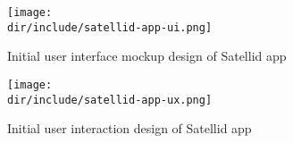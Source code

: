 \begin{figure}[htb]
  \centering
  \texttt{[image: \\dir/include/satellid-app-ui.png]}
  \caption{Initial user interface mockup design of Satellid app}
  \label{fig:satellid-app-ui}
\end{figure}

\begin{figure}[htb]
  \centering
  \texttt{[image: \\dir/include/satellid-app-ux.png]}
  \caption{Initial user interaction design of Satellid app}
  \label{fig:satellid-app-ux}
\end{figure}
